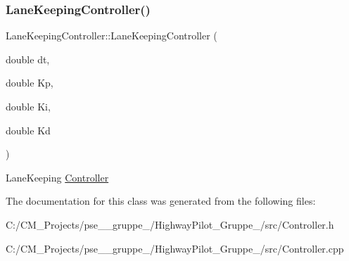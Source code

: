 \subsubsection{\texorpdfstring{LaneKeepingController()}{LaneKeepingController()}}
{\footnotesize\ttfamily Lane\+Keeping\+Controller\+::\+Lane\+Keeping\+Controller (\begin{DoxyParamCaption}\item[{double}]{dt,  }\item[{double}]{Kp,  }\item[{double}]{Ki,  }\item[{double}]{Kd }\end{DoxyParamCaption})}

Lane\+Keeping \mbox{\hyperlink{class_controller}{Controller}} 

The documentation for this class was generated from the following files\+:\begin{DoxyCompactItemize}
\item 
C\+:/\+C\+M\+\_\+\+Projects/pse\+\_\+\_\+gruppe\+\_/\+Highway\+Pilot\+\_\+\+Gruppe\+\_/src/Controller.\+h\item 
C\+:/\+C\+M\+\_\+\+Projects/pse\+\_\+\_\+gruppe\+\_/\+Highway\+Pilot\+\_\+\+Gruppe\+\_/src/Controller.\+cpp\end{DoxyCompactItemize}
